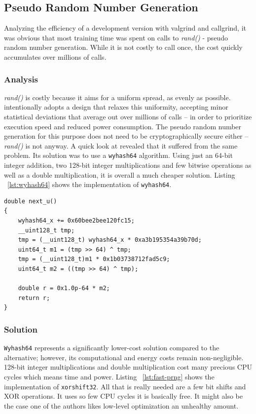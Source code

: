 \subsection{Pseudo Random Number Generation}
Analyzing the efficiency of a development version with valgrind and callgrind, it was obvious that most training time was spent on calls to \textit{rand()} - pseudo random number generation. 
While it is not costly to call once, the cost quickly accumulates over millions of calls.

\subsubsection{Analysis}
\textit{rand()} is costly because it aims for a uniform spread, as evenly as possible. \LibraryName intentionally adopts a design that relaxes this uniformity, accepting minor statistical deviations that average out over millions of calls -- in order to prioritize execution speed and reduced power consumption. The pseudo random number generation for this purpose does not need to be cryptographically secure either -- \textit{rand()} is not anyway. 
A quick look at \GreenTsetlinName revealed that it suffered from the same problem. Its solution was to use a \texttt{wyhash64} algorithm. Using just an 64-bit integer addition, two 128-bit integer multiplications and few bitwise operations as well as a double multiplication, it is overall a much cheaper solution. 
Listing ~\ref{lst:wyhash64} shows the \GreenTsetlinName implementation of \texttt{wyhash64}.
\begin{listing}[!htbp]
    \caption[\GreenTsetlinName implementation of \texttt{wyhash64}]{\GreenTsetlinName implementation of \texttt{wyhash64}\label{lst:wyhash64}}
    \begin{verbatim}
double next_u()
{
    wyhash64_x += 0x60bee2bee120fc15;
    __uint128_t tmp;
    tmp = (__uint128_t) wyhash64_x * 0xa3b195354a39b70d;
    uint64_t m1 = (tmp >> 64) ^ tmp;
    tmp = (__uint128_t)m1 * 0x1b03738712fad5c9;
    uint64_t m2 = ((tmp >> 64) ^ tmp);

    double r = 0x1.0p-64 * m2;
    return r;
}
    \end{verbatim}
\end{listing}

\subsubsection{Solution}
\texttt{Wyhash64} represents a significantly lower-cost solution compared to the alternative; however, its computational and energy costs remain non-negligible. 128-bit integer multiplications and double multiplication cost many precious CPU cycles which means time and power. 
Listing ~\ref{lst:fast-prng} shows the \LibraryName implementation of \texttt{xorshift32}. 
All that is really needed are a few bit shifts and XOR operations. It uses so few CPU cycles it is basically free. It might also be the case one of the authors likes low-level optimization an unhealthy amount. 

